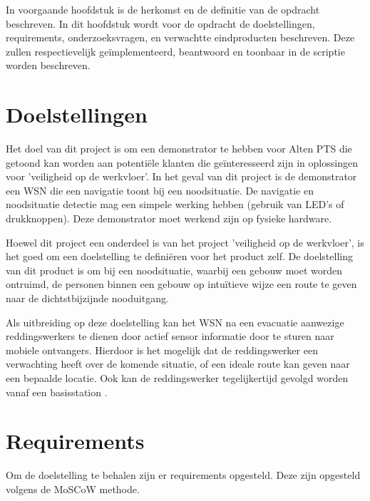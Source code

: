 \documentclass{../local}
\begin{document}
In voorgaande hoofdstuk is de herkomst en de definitie van de opdracht beschreven. In dit hoofdstuk wordt voor de opdracht de doelstellingen, requirements, onderzoeksvragen, en verwachtte eindproducten beschreven. Deze zullen respectievelijk geïmplementeerd, beantwoord en toonbaar in de scriptie worden beschreven. 

\section{Doelstellingen}
Het doel van dit project is om een demonstrator te hebben voor Alten PTS die getoond kan worden aan potentiële klanten die geïnteresseerd zijn in oplossingen voor 'veiligheid op de werkvloer'. In het geval van dit project is de demonstrator een WSN die een navigatie toont bij een noodsituatie. De navigatie en noodsituatie detectie mag een simpele werking hebben (gebruik van LED's of drukknoppen). Deze demonstrator moet werkend zijn op fysieke hardware. 

Hoewel dit project een onderdeel is van het project 'veiligheid op de werkvloer', is het goed om een doelstelling te definiëren voor het product zelf. De doelstelling van dit product is om bij een noodsituatie, waarbij een gebouw moet worden ontruimd, de personen binnen een gebouw op intuïtieve wijze een route te geven naar de dichtstbijzijnde nooduitgang.

Als uitbreiding op deze doelstelling kan het WSN na een evacuatie aanwezige reddingswerkers te dienen door actief sensor informatie door te sturen naar mobiele ontvangers. Hierdoor is het mogelijk dat de reddingswerker een verwachting heeft over de komende situatie, of een ideale route kan geven naar een bepaalde locatie. Ook kan de reddingswerker tegelijkertijd gevolgd worden vanaf een basisstation \cite{ShaWSN}.

\section{Requirements}
Om de doelstelling te behalen zijn er requirements opgesteld. Deze zijn opgesteld volgens de MoSCoW methode. 
\\\\
\end{document}
